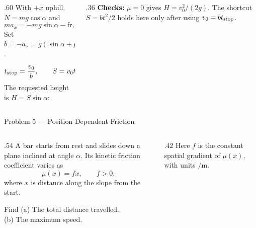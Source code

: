 \begin{solutionframe}
  \begin{columns}[T,onlytextwidth]
    \begin{column}{.60\textwidth}
      With \(+x\) uphill, \(N=mg\cos\alpha\) and
      \[
        ma_x=-mg\sin\alpha-\mathrm{fr},\qquad \mathrm{fr}=\mu N.
      \]
      Set \(b=-a_x=g(\sin\alpha+\mu\cos\alpha)>0\).
      \[
        t_{\rm stop}=\frac{v_0}{b},\qquad
        S=v_0t_{\rm stop}-\frac12bt_{\rm stop}^2
          =\frac{v_0^2}{2b}.
      \]
      The requested height is \(H=S\sin\alpha\):
    \end{column}
    \begin{column}{.36\textwidth}
      \medskip
      \textbf{Checks:} \(\mu=0\) gives \(H=v_0^2/(2g)\).
      The shortcut \(S=bt^2/2\) holds here only after using \(v_0=bt_{\rm stop}\).
    \end{column}
  \end{columns}
\end{solutionframe}

\begin{frame}{Problem 5 — Position-Dependent Friction}
  \par
  \small
  \begin{columns}[T,onlytextwidth]
    \begin{column}{.54\textwidth}
      A bar starts from rest and slides down a plane inclined at
      angle \(\alpha\). Its kinetic friction coefficient varies as
      \[
        \mu(x)=fx,\qquad f>0,
      \]
      where \(x\) is distance along the slope from the start.

      \begin{block}{Find}
        (a) The total distance travelled.\\
        (b) The maximum speed.
      \end{block}

    \end{column}
    \begin{column}{.42\textwidth}
      \medskip
      Here \(f\) is the constant spatial gradient of \(\mu(x)\),
      with units \(\si{\per\metre}\).
    \end{column}
  \end{columns}
\end{frame}

